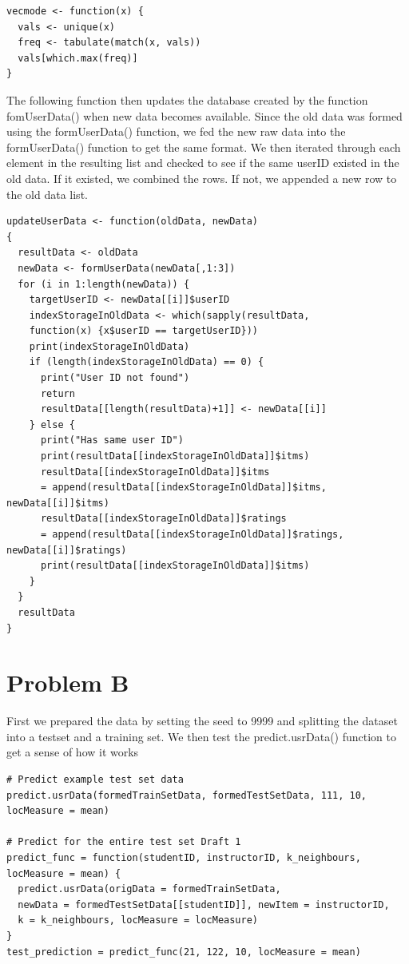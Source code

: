 \documentclass{article}
\begin{document}
\begin{verbatim}
vecmode <- function(x) {
  vals <- unique(x)
  freq <- tabulate(match(x, vals))
  vals[which.max(freq)]
}
\end{verbatim}

The following function then updates the database created by the function fomUserData() when new data becomes available. Since the old data was formed using the formUserData() function, we fed the new raw data into the formUserData() function to get the same format. We then iterated through each element in the resulting list and checked to see if the same userID existed in the old data. If it existed, we combined the rows. If not, we appended a new row to the old data list. 

\begin{verbatim}
updateUserData <- function(oldData, newData)
{
  resultData <- oldData
  newData <- formUserData(newData[,1:3])
  for (i in 1:length(newData)) {
    targetUserID <- newData[[i]]$userID
    indexStorageInOldData <- which(sapply(resultData, 
    function(x) {x$userID == targetUserID}))
    print(indexStorageInOldData)
    if (length(indexStorageInOldData) == 0) {
      print("User ID not found")
      return
      resultData[[length(resultData)+1]] <- newData[[i]]
    } else {
      print("Has same user ID")
      print(resultData[[indexStorageInOldData]]$itms)
      resultData[[indexStorageInOldData]]$itms 
      = append(resultData[[indexStorageInOldData]]$itms, newData[[i]]$itms)
      resultData[[indexStorageInOldData]]$ratings 
      = append(resultData[[indexStorageInOldData]]$ratings, newData[[i]]$ratings)
      print(resultData[[indexStorageInOldData]]$itms)
    }
  }
  resultData
}
\end{verbatim}

\section{Problem B}
First we prepared the data by setting the seed to 9999 and splitting the dataset into a testset and a training set. We then test the predict.usrData() function to get a sense of how it works

\begin{verbatim}
# Predict example test set data
predict.usrData(formedTrainSetData, formedTestSetData, 111, 10, locMeasure = mean)

# Predict for the entire test set Draft 1
predict_func = function(studentID, instructorID, k_neighbours, locMeasure = mean) {
  predict.usrData(origData = formedTrainSetData, 
  newData = formedTestSetData[[studentID]], newItem = instructorID, 
  k = k_neighbours, locMeasure = locMeasure)
}
test_prediction = predict_func(21, 122, 10, locMeasure = mean)
\end{verbatim}
\end{document}
